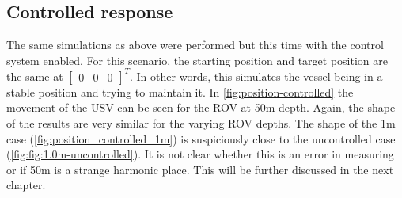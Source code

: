 \documentclass[class=article, crop=false]{standalone}
\begin{document}
\subsection{Controlled response}
The same simulations as above were performed but this time with the control system enabled. For this scenario, the starting position and target position are the same at \(\begin{bmatrix} 0 & 0 & 0 \end{bmatrix}^T\). In other words, this simulates the vessel being in a stable position and trying to maintain it. In \cref{fig:position-controlled} the movement of the USV can be seen for the ROV at 50m depth. Again, the shape of the results are very similar for the varying ROV depths. The shape of the 1m case (\cref{fig:position_controlled_1m}) is suspiciously close to the uncontrolled case (\cref{fig:fig:1.0m-uncontrolled}). It is not clear whether this is an error in measuring or if 50m is a strange harmonic place. This will be further discussed in the next chapter.
\end{document}
